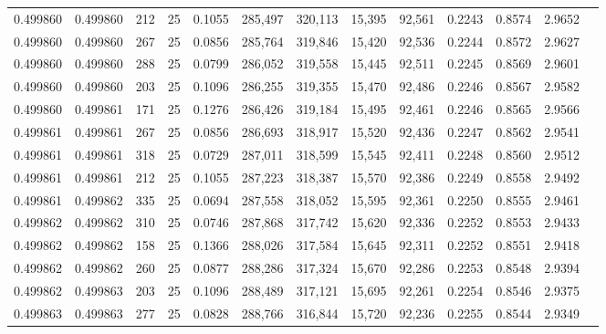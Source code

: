 \begin{tabular}{rrrrrrrrrrrrr}
0.499860 & 0.499860 &   212 &  25 &                                     0.1055 & 285,497 & 320,113 &  15,395 &  92,561 & 0.2243 & 0.8574 & 2.9652 \\
0.499860 & 0.499860 &   267 &  25 &                                     0.0856 & 285,764 & 319,846 &  15,420 &  92,536 & 0.2244 & 0.8572 & 2.9627 \\
0.499860 & 0.499860 &   288 &  25 &                                     0.0799 & 286,052 & 319,558 &  15,445 &  92,511 & 0.2245 & 0.8569 & 2.9601 \\
0.499860 & 0.499860 &   203 &  25 &                                     0.1096 & 286,255 & 319,355 &  15,470 &  92,486 & 0.2246 & 0.8567 & 2.9582 \\
0.499860 & 0.499861 &   171 &  25 &                                     0.1276 & 286,426 & 319,184 &  15,495 &  92,461 & 0.2246 & 0.8565 & 2.9566 \\
0.499861 & 0.499861 &   267 &  25 &                                     0.0856 & 286,693 & 318,917 &  15,520 &  92,436 & 0.2247 & 0.8562 & 2.9541 \\
0.499861 & 0.499861 &   318 &  25 &                                     0.0729 & 287,011 & 318,599 &  15,545 &  92,411 & 0.2248 & 0.8560 & 2.9512 \\
0.499861 & 0.499861 &   212 &  25 &                                     0.1055 & 287,223 & 318,387 &  15,570 &  92,386 & 0.2249 & 0.8558 & 2.9492 \\
0.499861 & 0.499862 &   335 &  25 &                                     0.0694 & 287,558 & 318,052 &  15,595 &  92,361 & 0.2250 & 0.8555 & 2.9461 \\
0.499862 & 0.499862 &   310 &  25 &                                     0.0746 & 287,868 & 317,742 &  15,620 &  92,336 & 0.2252 & 0.8553 & 2.9433 \\
0.499862 & 0.499862 &   158 &  25 &                                     0.1366 & 288,026 & 317,584 &  15,645 &  92,311 & 0.2252 & 0.8551 & 2.9418 \\
0.499862 & 0.499862 &   260 &  25 &                                     0.0877 & 288,286 & 317,324 &  15,670 &  92,286 & 0.2253 & 0.8548 & 2.9394 \\
0.499862 & 0.499863 &   203 &  25 &                                     0.1096 & 288,489 & 317,121 &  15,695 &  92,261 & 0.2254 & 0.8546 & 2.9375 \\
0.499863 & 0.499863 &   277 &  25 &                                     0.0828 & 288,766 & 316,844 &  15,720 &  92,236 & 0.2255 & 0.8544 & 2.9349 \\

\end{tabular}

